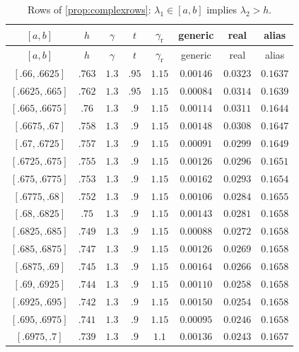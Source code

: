 \documentclass[11pt]{amsart}
\numberwithin{equation}{section}
\theoremstyle{plain}
\theoremstyle{definition}
\theoremstyle{remark}
\newcommand{\1}{\mathbf{1}}
\begin{document}
\begin{center}
\scriptsize
\begin{longtable}{@{}cccccccc@{}}
\caption{Rows of \cref{prop:complexrows}: $\lambda_1\in[a,b]$ implies $\lambda_2>h$.}\label{tab:complexrows}\\
\toprule
$[a,b]$ & $h$ & $\gamma$ & $t$ & $\gamma_{\mathrm r}$ & generic & real & alias \\
\midrule
\endfirsthead
\toprule
$[a,b]$ & $h$ & $\gamma$ & $t$ & $\gamma_{\mathrm r}$ & generic & real & alias \\
\midrule
\endhead
\bottomrule
\endfoot
$[.66,.6625]$ & $.763$ & $1.3$ & $.95$ & $1.15$ & $0.00146$ & $0.0323$ & $0.1637$ \\
$[.6625,.665]$ & $.762$ & $1.3$ & $.95$ & $1.15$ & $0.00084$ & $0.0314$ & $0.1639$ \\
$[.665,.6675]$ & $.76$ & $1.3$ & $.9$ & $1.15$ & $0.00114$ & $0.0311$ & $0.1644$ \\
$[.6675,.67]$ & $.758$ & $1.3$ & $.9$ & $1.15$ & $0.00148$ & $0.0308$ & $0.1647$ \\
$[.67,.6725]$ & $.757$ & $1.3$ & $.9$ & $1.15$ & $0.00091$ & $0.0299$ & $0.1649$ \\
$[.6725,.675]$ & $.755$ & $1.3$ & $.9$ & $1.15$ & $0.00126$ & $0.0296$ & $0.1651$ \\
$[.675,.6775]$ & $.753$ & $1.3$ & $.9$ & $1.15$ & $0.00162$ & $0.0293$ & $0.1654$ \\
$[.6775,.68]$ & $.752$ & $1.3$ & $.9$ & $1.15$ & $0.00106$ & $0.0284$ & $0.1655$ \\
$[.68,.6825]$ & $.75$ & $1.3$ & $.9$ & $1.15$ & $0.00143$ & $0.0281$ & $0.1658$ \\
$[.6825,.685]$ & $.749$ & $1.3$ & $.9$ & $1.15$ & $0.00088$ & $0.0272$ & $0.1658$ \\
$[.685,.6875]$ & $.747$ & $1.3$ & $.9$ & $1.15$ & $0.00126$ & $0.0269$ & $0.1658$ \\
$[.6875,.69]$ & $.745$ & $1.3$ & $.9$ & $1.15$ & $0.00164$ & $0.0266$ & $0.1658$ \\
$[.69,.6925]$ & $.744$ & $1.3$ & $.9$ & $1.15$ & $0.00110$ & $0.0258$ & $0.1658$ \\
$[.6925,.695]$ & $.742$ & $1.3$ & $.9$ & $1.15$ & $0.00150$ & $0.0254$ & $0.1658$ \\
$[.695,.6975]$ & $.741$ & $1.3$ & $.9$ & $1.15$ & $0.00095$ & $0.0246$ & $0.1658$ \\
$[.6975,.7]$ & $.739$ & $1.3$ & $.9$ & $1.1$ & $0.00136$ & $0.0243$ & $0.1657$ \\

\end{longtable}
\end{center}
\end{document}
